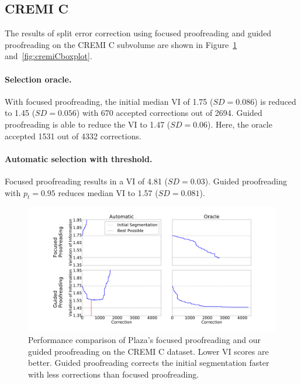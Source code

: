 \subsection{CREMI C}

The results of split error correction using focused proofreading and guided proofreading on the CREMI C subvolume are shown in Figure~\ref{fig:cremiCtrails} and~\ref{fig:cremiCboxplot}.

\paragraph{Selection oracle.} With focused proofreading, the initial median VI of 1.75 ($SD=0.086$) is reduced to 1.45 ($SD=0.056$) with 670 accepted corrections out of 2694. Guided proofreading is able to reduce the VI to 1.47 ($SD=0.06$). Here, the oracle accepted 1531 out of 4332 corrections. 

\paragraph{Automatic selection with threshold.} Focused proofreading results in a VI of 4.81 ($SD=0.03$). Guided proofreading with $p_t=0.95$ reduces median VI to 1.57 ($SD=0.081$).

\begin{figure}[t]
\centering
\includegraphics[width=\linewidth]{gfx/cremiCtrails.pdf}
\caption{Performance comparison of Plaza's focused proofreading and our guided proofreading on the CREMI C dataset. Lower VI scores are better. Guided proofreading corrects the initial segmentation faster with less corrections than focused proofreading.}
\label{fig:cremiCtrails}
\end{figure}

